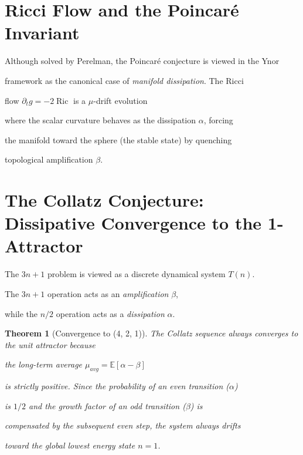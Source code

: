 \documentclass[11pt,a4paper]{amsart}
\newtheorem{theorem}{Theorem}[section]
\newcommand{\alphacoeff}{\ensuremath{\alpha}}
\newcommand{\betacoeff}{\ensuremath{\beta}}
\newcommand{\mumargin}{\ensuremath{\mu}}
\begin{document}

\section{Ricci Flow and the Poincaré Invariant}

Although solved by Perelman, the Poincaré conjecture is viewed in the Ynor 

framework as the canonical case of \emph{manifold dissipation}. The Ricci 

flow $\partial_t g = -2\operatorname{Ric}$ is a $\mumargin$-drift evolution 

where the scalar curvature behaves as the dissipation $\alphacoeff$, forcing 

the manifold toward the sphere (the stable state) by quenching 

topological amplification $\betacoeff$.





\section{The Collatz Conjecture: Dissipative Convergence to the 1-Attractor}

The $3n+1$ problem is viewed as a discrete dynamical system $T(n)$. 

The $3n+1$ operation acts as an \emph{amplification} $\betacoeff$, 

while the $n/2$ operation acts as a \emph{dissipation} $\alphacoeff$. 



\begin{theorem}[Convergence to (4, 2, 1)]

The Collatz sequence always converges to the unit attractor because 

the long-term average $\mumargin_{avg} = \mathbb{E}[\alphacoeff - \betacoeff]$ 

is strictly positive. Since the probability of an even transition ($\alphacoeff$) 

is $1/2$ and the growth factor of an odd transition ($\betacoeff$) is 

compensated by the subsequent even step, the system always drifts 

toward the global lowest energy state $n=1$.

\end{theorem}
\end{document}
